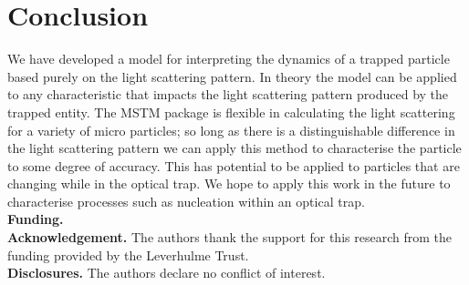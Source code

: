 \documentclass[final, 3p]{elsarticle}
\begin{document}
\section{Conclusion}
\label{4}
We have developed a model for interpreting the dynamics of a trapped particle based purely on the light scattering pattern. In theory the model can be applied to any characteristic that impacts the light scattering pattern produced by the trapped entity. The MSTM package is flexible in calculating the light scattering for a variety of micro particles; so long as there is a distinguishable difference in the light scattering pattern we can apply this method to characterise the particle to some degree of accuracy. This has potential to be applied to particles that are changing while in the optical trap. We hope to apply this work in the future to  characterise processes such as nucleation within an optical trap.\\

\noindent \textbf{Funding.} \\

\noindent \textbf{Acknowledgement.} The authors thank the support for this research from the funding provided by the Leverhulme Trust. \\
  
\noindent \textbf{Disclosures.} The authors declare no conflict of interest. \\


 


\newpage
\appendix
\onecolumn
\end{document}
